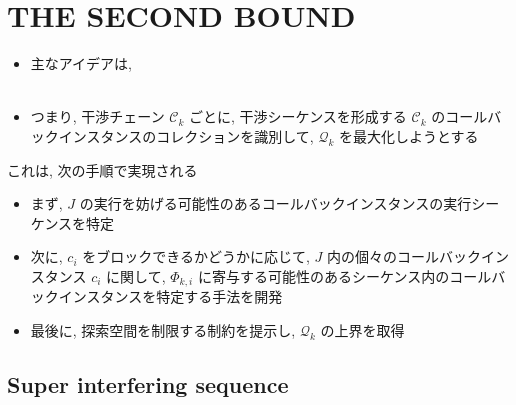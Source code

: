 
\section{THE SECOND BOUND}
\label{sec: the_second_bound}

\begin{frame}{}
    \begin{itemize}
        \item 主なアイデアは, \\\\
        \item つまり, 干渉チェーン $\mathcal{C}_{k}$ ごとに, 干渉シーケンスを形成する $\mathcal{C}_{k}$ のコールバックインスタンスのコレクションを識別して, $\mathcal{Q}_{k}$ を最大化しようとする
    \end{itemize}
\end{frame}

\begin{frame}{}
    これは, 次の手順で実現される
    \begin{itemize}
        \item まず,  $J$ の実行を妨げる可能性のあるコールバックインスタンスの実行シーケンスを特定
        \item 次に, $c_{i}$ をブロックできるかどうかに応じて, $J$ 内の個々のコールバックインスタンス $c_{i}$ に関して, $\Phi_{k, i}$ に寄与する可能性のあるシーケンス内のコールバックインスタンスを特定する手法を開発
        \item 最後に, 探索空間を制限する制約を提示し, $\mathcal{Q}_{k}$ の上界を取得
    \end{itemize}
\end{frame}


\subsection{Super interfering sequence}
\label{ssec: super_interfering_sequence}

